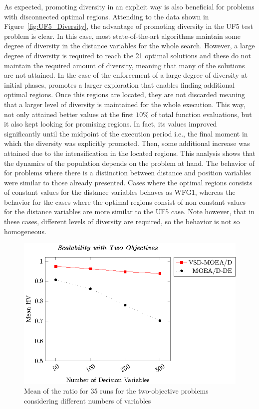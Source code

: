 As expected, promoting diversity in an explicit way is also beneficial for problems with disconnected optimal regions.
%
Attending to the data shown in Figure~\ref{fig:UF5_Diversity}, the advantage of promoting diversity in the UF5 test 
problem is clear.
%
In this case, most state-of-the-art algorithms maintain some degree of diversity in the distance variables for
the whole search.
%
However, a large degree of diversity is required to reach the 21 optimal solutions and these \MOEAS{} do not maintain
the required amount of diversity, meaning that many of the solutions are not attained.
%
In the case of \AVSDMOEAD{} the enforcement of a large degree of diversity at initial phases, promotes a larger exploration 
that enables finding additional optimal regions.
%
Once this regions are located, they are not discarded meaning that a larger level of diversity is maintained for the whole
execution.
%
This way, \AVSDMOEAD{} not only attained better \HV{} values at the first $10\%$ of total function evaluations, but 
it also kept looking for promising regions.
%
In fact, its \HV{} values improved significantly until the midpoint of the execution period i.e., the final moment
in which the diversity was explicitly promoted.
%
Then, some additional increase was attained due to the intensification in the located regions.
%
This analysis shows that the dynamics of the population depends on the problem at hand.
%
The behavior of \AVSDMOEAD{} for problems where there is a distinction between distance and position variables 
were similar to those already presented.
%
Cases where the optimal regions consists of constant values for the distance variables behaves as WFG1, whereas
the behavior for the cases where the optimal regions consist of non-constant values for the distance variables are
more similar to the UF5 case.
%
Note however, that in these cases, different levels of diversity are required, so the behavior is not so homogeneous.

\begin{figure}[t]
\centering
\includegraphics[scale=0.75]{images/Graphic-Scalability-2obj_tikz-figure0.eps}
\caption{Mean of the \HV{} ratio for 35 runs for the two-objective problems considering different numbers of variables}\label{fig:scalability-2obj}
\end{figure}


